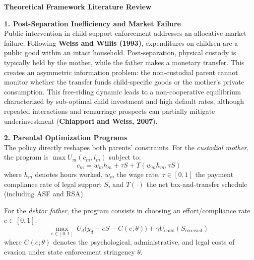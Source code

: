 \documentclass[11pt,a4paper]{article}
\begin{document}
\begin{center}
\Large\textbf{Theoretical Framework Literature Review}
\end{center}
\vspace{0.4cm}

\noindent\textbf{1. Post-Separation Inefficiency and Market Failure} \\
Public intervention in child support enforcement addresses an allocative market failure. Following \textbf{Weiss and Willis (1993)}, expenditures on children are a public good within an intact household. Post-separation, physical custody is typically held by the mother, while the father makes a monetary transfer. This creates an asymmetric information problem: the non-custodial parent cannot monitor whether the transfer funds child-specific goods or the mother's private consumption. This free-riding dynamic leads to a non-cooperative equilibrium characterized by sub-optimal child investment and high default rates, although repeated interactions and remarriage prospects can partially mitigate underinvestment (\textbf{Chiappori and Weiss, 2007}).

\vspace{0.35cm}
\noindent\textbf{2. Parental Optimization Programs} \\
The policy directly reshapes both parents' constraints. For the \textit{custodial mother}, the program is $\max U_m(c_m, l_m)$ subject to:
\begin{equation}
c_m = w_m h_m + \tau S + T(w_m h_m, \tau S)
\end{equation}
where $h_m$ denotes hours worked, $w_m$ the wage rate, $\tau \in [0, 1]$ the payment compliance rate of legal support $S$, and $T(\cdot)$ the net tax-and-transfer schedule (including ASF and RSA).

For the \textit{debtor father}, the program consists in choosing an effort/compliance rate $e \in [0,1]$:
\begin{equation}
\max_{e \in [0,1]} \; U_d\big(y_d - e S - C(e; \theta)\big) + \gamma U_{\text{child}}(S_{\text{received}})
\end{equation}
where $C(e; \theta)$ denotes the psychological, administrative, and legal costs of evasion under state enforcement stringency $\theta$.
\end{document}
